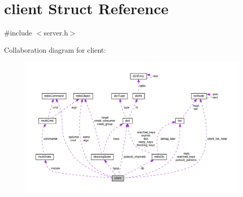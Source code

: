\hypertarget{structclient}{}\section{client Struct Reference}
\label{structclient}


{\ttfamily \#include $<$server.\+h$>$}



Collaboration diagram for client\+:
\nopagebreak
\begin{figure}[H]
\begin{center}
\leavevmode
\includegraphics[width=350pt]{structclient__coll__graph}
\end{center}
\end{figure}
